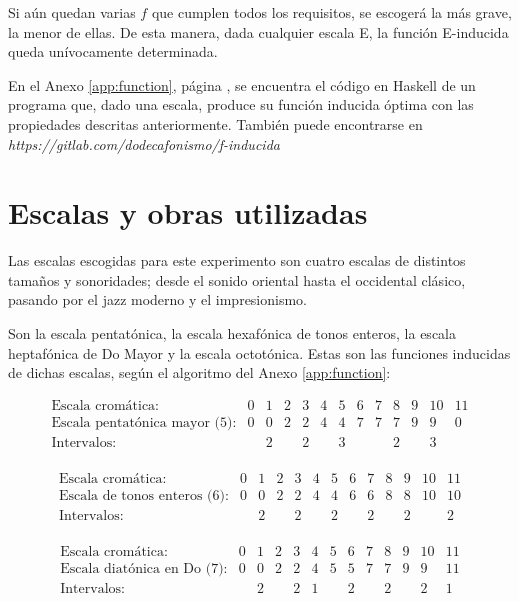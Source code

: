 		Si aún quedan varias $f$ que cumplen todos los requisitos, se escogerá la más grave, la menor de ellas. De esta manera, dada cualquier escala E, la función E-inducida queda unívocamente determinada.
		
		En el Anexo \ref{app:function}, página \pageref{app:function}, se encuentra el código en Haskell de un programa que, dado una escala, produce su función inducida óptima con las propiedades descritas anteriormente. También puede encontrarse en \textit{https://gitlab.com/dodecafonismo/f-inducida}
		
	\section{Escalas y obras utilizadas}
	
		Las escalas escogidas para este experimento son cuatro escalas de distintos tamaños y sonoridades; desde el sonido oriental hasta el occidental clásico, pasando por el jazz moderno y el impresionismo.
		
		Son la escala pentatónica, la escala hexafónica de tonos enteros, la escala heptafónica de Do Mayor y la escala octotónica. Estas son las funciones inducidas de dichas escalas, según el algoritmo del Anexo \ref{app:function}:
	
		$$\left.\begin{matrix}
		\text{Escala cromática:}&0&1&2&3&4&5&6&7&8&9&10&11\\
		\text{Escala pentatónica mayor (5):}&0&0&2&2&4&4&7&7&7&9&9&0\\
		\text{Intervalos:}&&2&&2&&3&&&2&&3&\\
		\end{matrix}\right.$$
		
		$$\left.\begin{matrix}
		\text{Escala cromática:}&0&1&2&3&4&5&6&7&8&9&10&11\\
		\text{Escala de tonos enteros (6):}&0&0&2&2&4&4&6&6&8&8&10&10\\
		\text{Intervalos:}&&2&&2&&2&&2&&2&&2\\
		\end{matrix}\right.$$

        $$\left.\begin{matrix}
        \text{Escala cromática:}&0&1&2&3&4&5&6&7&8&9&10&11\\
        \text{Escala diatónica en Do (7):}&0&0&2&2&4&5&5&7&7&9&9&11\\
        \text{Intervalos:}&&2&&2&1&&2&&2&&2&1\\
        \end{matrix}\right.$$
        
